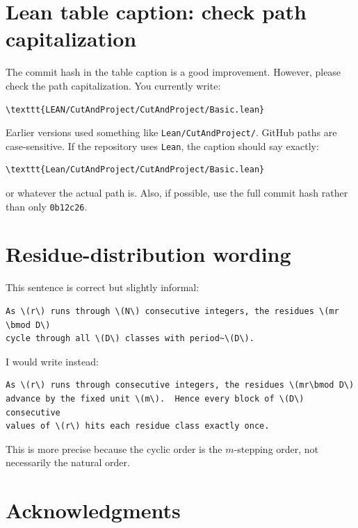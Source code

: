 \documentclass[11pt]{article}
\begin{document}
\section{Lean table caption: check path capitalization}

The commit hash in the table caption is a good improvement.  However, please
check the path capitalization.  You currently write:

\begin{lstlisting}
\texttt{LEAN/CutAndProject/CutAndProject/Basic.lean}
\end{lstlisting}

Earlier versions used something like \texttt{Lean/CutAndProject/}.  GitHub
paths are case-sensitive.  If the repository uses \texttt{Lean}, the caption
should say exactly:

\begin{lstlisting}
\texttt{Lean/CutAndProject/CutAndProject/Basic.lean}
\end{lstlisting}

or whatever the actual path is.  Also, if possible, use the full commit hash
rather than only \texttt{0b12c26}.

\section{Residue-distribution wording}

This sentence is correct but slightly informal:

\begin{lstlisting}
As \(r\) runs through \(N\) consecutive integers, the residues \(mr \bmod D\)
cycle through all \(D\) classes with period~\(D\).
\end{lstlisting}

I would write instead:

\begin{lstlisting}
As \(r\) runs through consecutive integers, the residues \(mr\bmod D\)
advance by the fixed unit \(m\).  Hence every block of \(D\) consecutive
values of \(r\) hits each residue class exactly once.
\end{lstlisting}

This is more precise because the cyclic order is the \(m\)-stepping order,
not necessarily the natural order.

\section{Acknowledgments}
\end{document}
